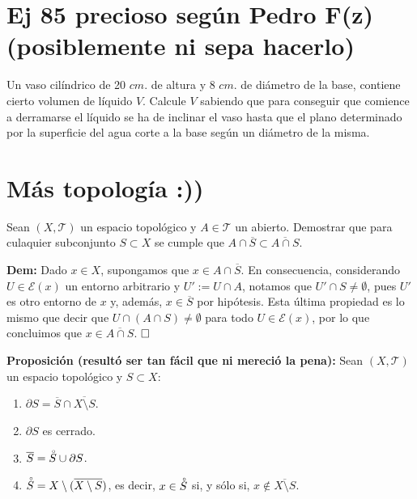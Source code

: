 \documentclass{article}
\begin{document}
\newpage

\section{Ej 85 precioso según Pedro F(z) (posiblemente ni sepa hacerlo)}

Un vaso cilíndrico de 20 $cm.$ de altura y 8 $cm.$ de diámetro de la base, contiene cierto volumen de líquido $V$. Calcule $V$ sabiendo que para conseguir que comience a derramarse el líquido se ha de inclinar el vaso hasta que el plano determinado por la superficie del agua corte a la base según un diámetro de la misma. 

\newpage

\section{Más topología :))}

Sean $(X, \mathcal{T})$ un espacio topológico y $A \in \mathcal{T}$ un abierto. Demostrar que para culaquier subconjunto $S \subset X$ se cumple que $A \cap \overline{S} \subset \overline{A \cap S}$.

\vspace{0.5cm}

\noindent\textbf{Dem:} Dado $x \in X$, supongamos que $x \in A \cap \overline{S}$. En consecuencia, considerando $U \in \mathcal{E}(x)$ un entorno arbitrario y $U' := U \cap A$, notamos que $U' \cap S \neq \emptyset$, pues $U'$ es otro entorno de $x$ y, además, $x \in \overline{S}$ por hipótesis. Esta última propiedad es lo mismo que decir que $U \cap (A \cap S) \neq \emptyset$ para todo $U \in \mathcal{E}(x)$, por lo que concluimos que $x \in \overline{A \cap S}$. $\hfill\square$

\vspace{1cm}

\noindent\textbf{Proposición (resultó ser tan fácil que ni mereció la pena):} Sean $(X, \mathcal{T})$ un espacio topológico y $S \subset X$:

\begin{enumerate}[label=(\textit{\roman*})]
    \item $\partial S = \overline{S} \cap \overline{X \setminus S}$.
    \item $\partial S$ es cerrado.
    \item $\overline{S} = \accentset{\circ}{S} \cup \partial S$.
    \item $\accentset{\circ}{S} = X \setminus (\overline{X \setminus S})$, es decir, $x \in \accentset{\circ}{S}$ si, y sólo si, $x \notin \overline{X \setminus S}$.
\end{enumerate}
\end{document}
